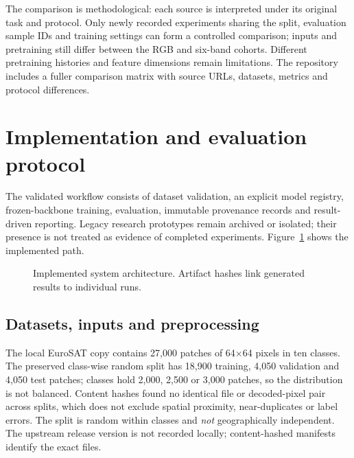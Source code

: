 \documentclass[3p,times,procedia]{elsarticle}
\begin{document}
The comparison is methodological: each source is interpreted under its original task and protocol. Only newly recorded experiments sharing the split, evaluation sample IDs and training settings can form a controlled comparison; inputs and pretraining still differ between the RGB and six-band cohorts. Different pretraining histories and feature dimensions remain limitations. The repository includes a fuller comparison matrix with source URLs, datasets, metrics and protocol differences.

\section{Implementation and evaluation protocol}\label{sec:implementation}
The validated workflow consists of dataset validation, an explicit model registry, frozen-backbone training, evaluation, immutable provenance records and result-driven reporting. Legacy research prototypes remain archived or isolated; their presence is not treated as evidence of completed experiments. Figure~\ref{fig:architecture} shows the implemented path.
\begin{figure}[htbp]\centering
{}
\caption{Implemented system architecture. Artifact hashes link generated results to individual runs.}\label{fig:architecture}
\end{figure}

\subsection{Datasets, inputs and preprocessing}\label{sec:data}
The local EuroSAT copy contains 27,000 patches of 64$\times$64 pixels in ten classes. The preserved class-wise random split has 18,900 training, 4,050 validation and 4,050 test patches; classes hold 2,000, 2,500 or 3,000 patches, so the distribution is not balanced. Content hashes found no identical file or decoded-pixel pair across splits, which does not exclude spatial proximity, near-duplicates or label errors. The split is random within classes and \emph{not} geographically independent. The upstream release version is not recorded locally; content-hashed manifests identify the exact files.
\end{document}
